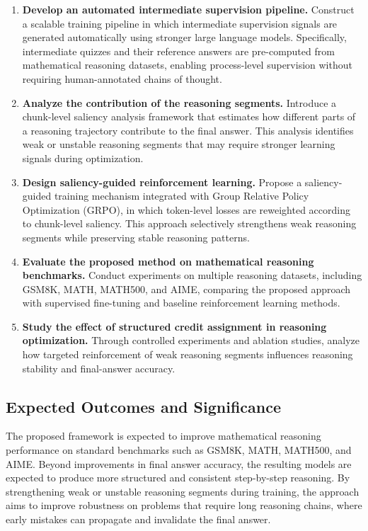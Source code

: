 \documentclass[12pt]{report}
\begin{document}
\begin{enumerate}

\item \textbf{Develop an automated intermediate supervision pipeline.}  
Construct a scalable training pipeline in which intermediate supervision signals are generated automatically using stronger large language models. 
Specifically, intermediate quizzes and their reference answers are pre-computed from mathematical reasoning datasets, enabling process-level supervision without requiring human-annotated chains of thought.

\item \textbf{Analyze the contribution of the reasoning segments.}  
Introduce a chunk-level saliency analysis framework that estimates how different parts of a reasoning trajectory contribute to the final answer. 
This analysis identifies weak or unstable reasoning segments that may require stronger learning signals during optimization.

\item \textbf{Design saliency-guided reinforcement learning.}  
Propose a saliency-guided training mechanism integrated with Group Relative Policy Optimization (GRPO), in which token-level losses are reweighted according to chunk-level saliency. 
This approach selectively strengthens weak reasoning segments while preserving stable reasoning patterns.

\item \textbf{Evaluate the proposed method on mathematical reasoning benchmarks.}  
Conduct experiments on multiple reasoning datasets, including GSM8K, MATH, MATH500, and AIME, comparing the proposed approach with supervised fine-tuning and baseline reinforcement learning methods.

\item \textbf{Study the effect of structured credit assignment in reasoning optimization.}  
Through controlled experiments and ablation studies, analyze how targeted reinforcement of weak reasoning segments influences reasoning stability and final-answer accuracy.

\end{enumerate}

\subsection{Expected Outcomes and Significance}

The proposed framework is expected to improve mathematical reasoning performance on standard benchmarks such as GSM8K, MATH, MATH500, and AIME. 
Beyond improvements in final answer accuracy, the resulting models are expected to produce more structured and consistent step-by-step reasoning. 
By strengthening weak or unstable reasoning segments during training, the approach aims to improve robustness on problems that require long reasoning chains, where early mistakes can propagate and invalidate the final answer.
\end{document}
